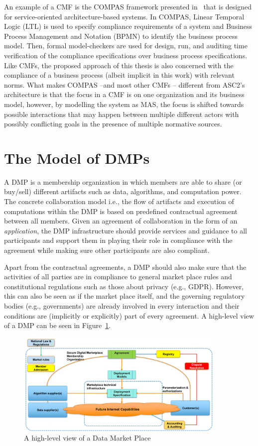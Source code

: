 An example of a CMF is the COMPAS framework presented in~\cite{elgammal@thesis} that is designed for service-oriented architecture-based systems. In COMPAS,  Linear Temporal Logic (LTL) is used to specify compliance requirements of a system and Business Process Management and Notation (BPMN) to identify the business process model. Then, formal model-checkers are used for design, run, and auditing time verification of the compliance specifications over business process specifications. Like CMFs, the proposed approach of this thesis is also concerned with the compliance of a business process (albeit implicit in this work) with relevant norms. What makes COMPAS --and most other CMFs -- different from ASC2's architecture is that the focus in a CMF is on one organization and its business model, however, by modelling the system as MAS, the focus is shifted towards possible interactions that may happen between multiple different actors with possibly conflicting goals in the presence of multiple normative sources.


\section{The Model of DMPs}
A DMP is a membership organization in which members are able to share (or buy/sell) different artifacts such as data, algorithms, and computation power. The concrete collaboration model i.e., the flow of artifacts and execution of computations within the DMP is based on predefined contractual agreement between all members. Given an agreement of collaboration in the form of an \textit{application}, the DMP infrastructure should provide services and guidance to all participants and support them in playing their role in compliance with the agreement while making sure other participants are also compliant. 

Apart from the contractual agreements, a DMP should also make sure that the activities of all parties are in compliance to general market place rules and constitutional regulations such as those about privacy (e.g., GDPR). However, this can also be seen as if the market place itself, and the governing regulatory bodies (e.g., governments) are already involved in every interaction and their conditions are (implicitly or explicitly) part of every agreement. A high-level view of a DMP can be seen in Figure~\ref{fig:market}.

\begin{figure}[!thb]
    \centering
    \includegraphics[width=0.9\textwidth]{ch_cmf/market.png}
    \caption{A high-level view of a Data Market Place}
    \label{fig:market}
\end{figure}

